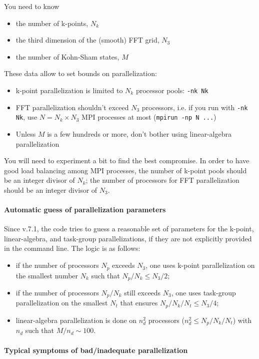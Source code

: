 \documentclass[12pt,a4paper]{article}
\begin{document}
You need to know
\begin{itemize}
\item 
  the number of k-points, $N_k$
\item
  the third dimension of the (smooth) FFT grid, $N_3$
\item
  the number of Kohn-Sham states, $M$
\end{itemize}
These data allow to set bounds on parallelization:
\begin{itemize}
\item 
  k-point parallelization is limited to $N_k$ processor pools: 
  \texttt{-nk Nk}
\item
  FFT parallelization shouldn't exceed $N_3$ processors, i.e. if you
  run with \texttt{-nk Nk}, use $N=N_k\times N_3$ MPI processes at most (\texttt{mpirun -np N ...})
\item
  Unless $M$ is a few hundreds or more, don't bother using linear-algebra
  parallelization
\end{itemize}
You will need to experiment a bit to find the best compromise. In order
to have good load balancing among MPI processes, the number of k-point
pools should be an integer divisor of $N_k$; the number of processors for
FFT parallelization should be an integer divisor of $N_3$. 

\paragraph{Automatic guess of parallelization parameters}

Since v.7.1, the code tries to guess a reasonable set of parameters
for the k-point, linear-algebra, and task-group parallelizations, if
they are not explicitly provided in the command line. The logic is
as follows:
\begin{itemize}
\item 
  if the number of processors $N_p$ exceeds $N_3$, one uses k-point
  parallelization on the smallest number $N_k$ such that
  $N_p/N_k \le N_3/2$;
\item
  if the number of processors $N_p/N_k$ still exceeds $N_3$, one uses
  task-group parallelization on the smallest $N_t$ that ensures
  $N_p/N_k/N_t\le N_3/4$;
\item
  linear-algebra parallelization is done on $n_d^2$ processors
  ($n_d^2\le N_p/N_k/N_t$) with $n_d$ such that $M/n_d\sim 100$.
\end{itemize}

\paragraph{Typical symptoms of bad/inadequate parallelization}
\end{document}
